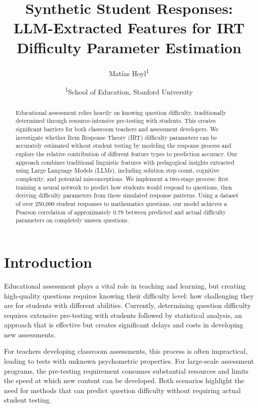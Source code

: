 \documentclass[
    a4paper, %
    10pt, %
    twoside, %
]{LTJournalArticle}
\title{Synthetic Student Responses: LLM-Extracted Features for IRT Difficulty Parameter Estimation}
\author{%
    Matías Hoyl\textsuperscript{1} 
}
\date{\footnotesize \textsuperscript{1}School of Education, Stanford University}
\begin{document}
\maketitle

\begin{abstract}
Educational assessment relies heavily on knowing question difficulty, traditionally determined through resource-intensive pre-testing with students. This creates significant barriers for both classroom teachers and assessment developers. We investigate whether Item Response Theory (IRT) difficulty parameters can be accurately estimated without student testing by modeling the response process and explore the relative contribution of different feature types to prediction accuracy. Our approach combines traditional linguistic features with pedagogical insights extracted using Large Language Models (LLMs), including solution step count, cognitive complexity, and potential misconceptions. We implement a two-stage process: first training a neural network to predict how students would respond to questions, then deriving difficulty parameters from these simulated response patterns. Using a dataset of over 250,000 student responses to mathematics questions, our model achieves a Pearson correlation of approximately 0.78 between predicted and actual difficulty parameters on completely unseen questions.
\end{abstract}

\section{Introduction}

Educational assessment plays a vital role in teaching and learning, but creating high-quality questions requires knowing their difficulty level: how challenging they are for students with different abilities. Currently, determining question difficulty requires extensive pre-testing with students followed by statistical analysis, an approach that is effective but creates significant delays and costs in developing new assessments.

For teachers developing classroom assessments, this process is often impractical, leading to tests with unknown psychometric properties. For large-scale assessment programs, the pre-testing requirement consumes substantial resources and limits the speed at which new content can be developed. Both scenarios highlight the need for methods that can predict question difficulty without requiring actual student testing.
\end{document}
